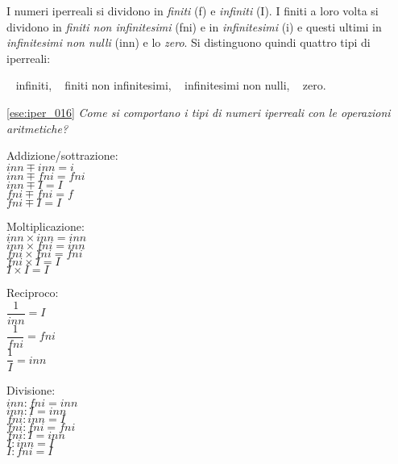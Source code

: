 I numeri iperreali si dividono in \emph{finiti} (f) e \emph{infiniti} (I). 
I finiti a loro volta si dividono in \emph{finiti non infinitesimi} (fni) e 
in \emph{infinitesimi} (i) e 
questi ultimi in \emph{infinitesimi non nulli} (inn) e lo \emph{zero}. 
Si distinguono quindi quattro tipi di iperreali: 
\begin{center}
\textbullet ~ infiniti, \qquad 
\textbullet ~ finiti non infinitesimi, \qquad 
\textbullet ~ infinitesimi non nulli, \qquad 
\textbullet ~ zero.
\end{center}

\ref{ese:iper_016} 
\emph{Come si comportano i tipi di numeri iperreali con le operazioni 
aritmetiche?}

\noindent\begin{minipage}{.30\textwidth}
 Addizione/sottrazione:\\
\(inn \mp inn = i\)\\
\(inn \mp fni = fni\)\\
\(inn \mp I = I\)\\
\(fni \mp fni = f\)\\
\(fni \mp I = I\)
\vspace{24pt}
\end{minipage}
\noindent\begin{minipage}{.25\textwidth}
 Moltiplicazione:\\
\(inn \times inn = inn\)\\
\(inn \times fni = inn\)\\
\(fni \times fni = fni\)\\
\(fni \times I = I\)\\
\(I \times I = I\)
\vspace{24pt}
\end{minipage}
\noindent\begin{minipage}{.15\textwidth}
 Reciproco:\\
\(\dfrac{1}{inn} = I\)\\
\(\dfrac{1}{fni} = fni\)\\
\(\dfrac{1}{I} = inn\)\\
\vspace{12pt}
\end{minipage}
\noindent\begin{minipage}{.25\textwidth}
 Divisione:\\
\(inn : fni = inn\)\\
\(inn : I = inn\)\\
\(fni : inn = I\)\\
\(fni : fni = fni\)\\
\(fni : I = inn\)\\
\(I : inn = I\)\\
\(I : fni = I\)
\end{minipage}

